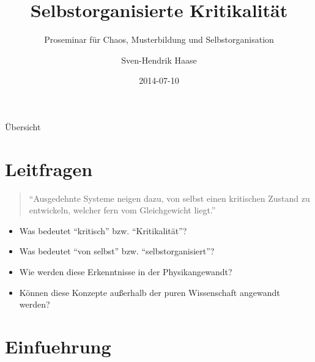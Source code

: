 \documentclass{beamer}
\begin{document}
\title{Selbstorganisierte Kritikalität}
\subtitle{Proseminar für Chaos, Musterbildung und Selbstorganisation}
\date{2014-07-10}
\author{Sven-Hendrik Haase}

\begin{frame}
    \titlepage
\end{frame}

\begin{frame}{Übersicht}
    \tableofcontents
\end{frame}

\section{Leitfragen}
\begin{frame}{\insertsection}{\insertsubsection}
	\begin{quote}
        ``Ausgedehnte Systeme neigen dazu, von selbst einen kritischen Zustand zu entwickeln,
        welcher fern vom Gleichgewicht liegt.''
        \tiny
	\end{quote}
    \pause
    \begin{itemize}
        \item Was bedeutet ``kritisch'' bzw. ``Kritikalität''?
        \pause
        \item Was bedeutet ``von selbst'' bzw. ``selbstorganisiert''?
        \pause
        \item Wie werden diese Erkenntnisse in der Physikangewandt?
        \pause
        \item Können diese Konzepte außerhalb der puren Wissenschaft angewandt werden?
    \end{itemize}
\end{frame}

\section{Einfuehrung}
\end{document}
